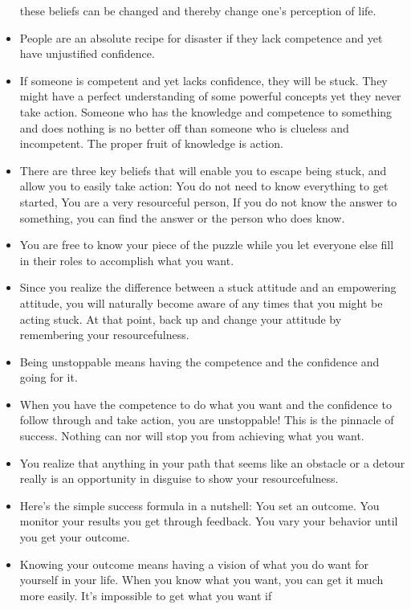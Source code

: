 \begin{itemize}
        these beliefs can be changed and thereby change one’s perception of life.
        \item People are an absolute recipe for disaster if they lack competence and yet have unjustified
        confidence.
        \item If someone is competent and yet lacks confidence, they will be stuck. They might have a perfect
        understanding of some powerful concepts yet they never take action. Someone who has the
        knowledge and competence to something and does nothing is no better off than someone who is
        clueless and incompetent. The proper fruit of knowledge is action.
        \item There are three key beliefs that will enable you to escape being stuck, and allow you to easily take
        action: You do not need to know everything to get started, You are a very resourceful person, If you do not know the answer to something, you can find the answer or the person who does
        know.
        \item You are free to know your piece of the puzzle
        while you let everyone else fill in their roles to accomplish what you want.
        \item Since you realize the difference between
        a stuck attitude and an empowering attitude, you will naturally become aware of any times that you
        might be acting stuck. At that point, back up and change your attitude by remembering your
        resourcefulness.
        \item Being unstoppable means having the competence and the confidence and going for it.
        \item When you have the competence to do what you want and the confidence to follow through and take
        action, you are unstoppable! This is the pinnacle of success. Nothing can nor will stop you from achieving what you want.
        \item You
        realize that anything in your path that seems like an obstacle or a detour really is an opportunity in
        disguise to show your resourcefulness.
        \item Here’s the simple success formula in a nutshell: You set an outcome. You monitor your results you get through feedback. You vary your behavior until you get your outcome.
        \item Knowing your outcome means having a vision of what you do want for yourself in your life. When
        you know what you want, you can get it much more easily. It’s impossible to get what you want if

\end{itemize}

